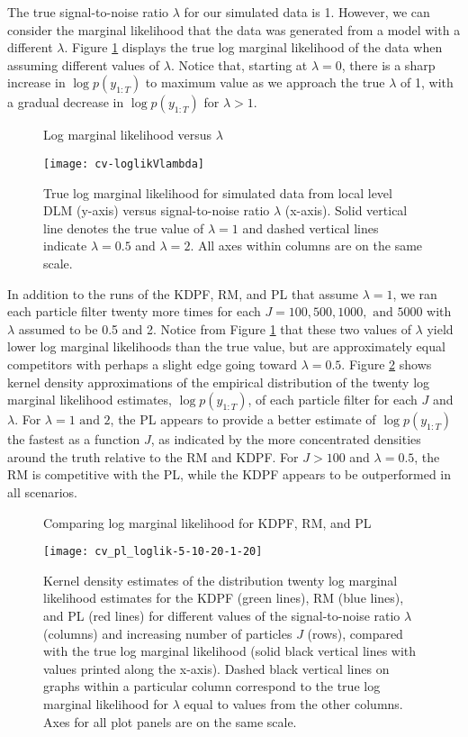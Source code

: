 The true signal-to-noise ratio $\lambda$ for our simulated data is 1. However, we can consider the marginal likelihood that the data was generated from a model with a different $\lambda$. Figure \ref{fig:comp:lambda} displays the true log marginal likelihood of the data when assuming different values of $\lambda$. Notice that, starting at $\lambda = 0$, there is a sharp increase in $\log p(y_{1:T})$ to maximum value as we approach the true $\lambda$ of 1, with a gradual decrease in $\log p(y_{1:T})$ for $\lambda > 1$.

\begin{figure}[ht]
\ssp
\centering
\caption{Log marginal likelihood versus $\lambda$} \label{fig:comp:lambda}
\texttt{[image: cv-loglikVlambda]}
\caption*{True log marginal likelihood for simulated data from local level DLM (y-axis) versus signal-to-noise ratio $\lambda$ (x-axis). Solid vertical line denotes the true value of $\lambda = 1$ and dashed vertical lines indicate $\lambda = 0.5$ and $\lambda = 2$. All axes within columns are on the same scale.}
\end{figure}

In addition to the runs of the KDPF, RM, and PL that assume $\lambda = 1$, we ran each particle filter twenty more times for each $J = 100, 500, 1000, \mbox{ and } 5000$ with $\lambda$ assumed to be 0.5 and 2. Notice from Figure \ref{fig:comp:lambda} that these two values of $\lambda$ yield lower log marginal likelihoods than the true value, but are approximately equal competitors with perhaps a slight edge going toward $\lambda = 0.5$. Figure \ref{fig:comp:loglik} shows kernel density approximations of the empirical distribution of the twenty log marginal likelihood estimates, $\log p(y_{1:T})$, of each particle filter for each $J$ and $\lambda$. For $\lambda = 1 \mbox{ and } 2$, the PL appears to provide a better estimate of $\log p(y_{1:T})$ the fastest as a function $J$, as indicated by the more concentrated densities around the truth relative to the RM and KDPF. For $J > 100$ and $\lambda = 0.5$, the RM is competitive with the PL, while the KDPF appears to be outperformed in all scenarios.

\begin{figure}[ht]
\ssp
\centering
\caption{Comparing log marginal likelihood for KDPF, RM, and PL} \label{fig:comp:loglik}
\texttt{[image: cv\_pl\_loglik-5-10-20-1-20]}
\caption*{Kernel density estimates of the distribution twenty log marginal likelihood estimates for the KDPF (green lines), RM (blue lines), and PL (red lines) for different values of the signal-to-noise ratio $\lambda$ (columns) and increasing number of particles $J$ (rows), compared with the true log marginal likelihood (solid black vertical lines with values printed along the x-axis). Dashed black vertical lines on graphs within a particular column correspond to the true log marginal likelihood for $\lambda$ equal to values from the other columns. Axes for all plot panels are on the same scale.}
\end{figure}

